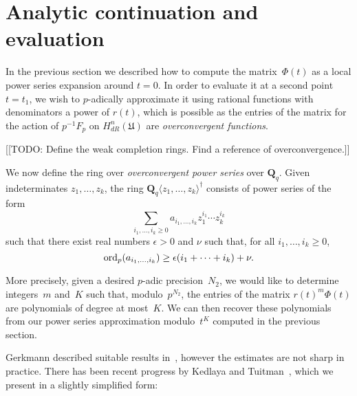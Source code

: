 \section{Analytic continuation and evaluation}
\label{sec:01-dm-06-continuation}

In the previous section we described how to compute the matrix~$\Phi(t)$ as 
a local power series expansion around $t = 0$.  In order to evaluate it 
at a second point $t = t_1$, we wish to $p$-adically approximate it 
using rational functions with denominators a power of $r(t)$, which 
is possible as the entries of the matrix for the action of $p^{-1} F_p$ 
on $H_{dR}^{n}(\mathfrak{U})$ are \emph{overconvergent functions}.

[[TODO:  Define the weak completion rings.  Find a reference of 
overconvergence.]]

\begin{defn} \label{defn:Overconvergence}
We now define the ring over \emph{overconvergent power series} 
over $\mathbf{Q}_q$.  Given indeterminates $z_1, \dotsc, z_k$, 
the ring $\mathbf{Q}_q \langle z_1, \dotsc, z_k \rangle^{\dagger}$ 
consists of power series of the form 
\begin{equation*}
\sum_{i_1,\dotsc,i_k \geq 0} a_{i_1,\dotsc,i_k} z_1^{i_1} \dotsm z_k^{i_k}
\end{equation*}
such that there exist real numbers $\epsilon > 0$ and $\nu$ 
such that, for all $i_1, \dotsc, i_k \geq 0$, 
\begin{equation*}
\operatorname{ord}_p (a_{i_1,\dotsc,i_k}) \geq \epsilon(i_1 + \dotsb + i_k) + \nu.
\end{equation*}
\end{defn}

More precisely, given a desired $p$-adic precision~$N_2$, we would 
like to determine integers~$m$ and~$K$ such that, modulo~$p^{N_2}$, 
the entries of the matrix $r(t)^m \Phi(t)$ are polynomials of degree 
at most~$K$.  We can then recover these polynomials from our power 
series approximation modulo~$t^K$ computed in the previous section.

Gerkmann described suitable results in~\citep[\S 6]{Gerkmann2007}, 
however the estimates are not sharp in practice.  There has been recent 
progress by Kedlaya and Tuitman~\citep[Theorem~2.1]{KedlayaTuitman2012}, 
which we present in a slightly simplified form:

